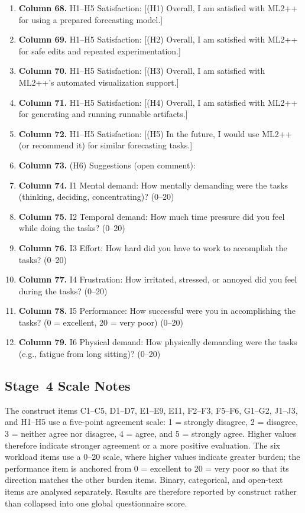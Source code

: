 \begin{enumerate}[leftmargin=*]
    \item \textbf{Column 68.} H1--H5 Satisfaction: [(H1) Overall, I am satisfied with ML2++ for using a prepared forecasting model.]
    \item \textbf{Column 69.} H1--H5 Satisfaction: [(H2) Overall, I am satisfied with ML2++ for safe edits and repeated experimentation.]
    \item \textbf{Column 70.} H1--H5 Satisfaction: [(H3) Overall, I am satisfied with ML2++'s automated visualization support.]
    \item \textbf{Column 71.} H1--H5 Satisfaction: [(H4) Overall, I am satisfied with ML2++ for generating and running runnable artifacts.]
    \item \textbf{Column 72.} H1--H5 Satisfaction: [(H5) In the future, I would use ML2++ (or recommend it) for similar forecasting tasks.]
    \item \textbf{Column 73.} (H6) Suggestions (open comment):
    \item \textbf{Column 74.} I1 Mental demand: How mentally demanding were the tasks (thinking, deciding, concentrating)? (0--20)
    \item \textbf{Column 75.} I2 Temporal demand: How much time pressure did you feel while doing the tasks? (0--20)
    \item \textbf{Column 76.} I3 Effort: How hard did you have to work to accomplish the tasks? (0--20)
    \item \textbf{Column 77.} I4 Frustration: How irritated, stressed, or annoyed did you feel during the tasks? (0--20)
    \item \textbf{Column 78.} I5 Performance: How successful were you in accomplishing the tasks? (0 = excellent, 20 = very poor) (0--20)
    \item \textbf{Column 79.} I6 Physical demand: How physically demanding were the tasks (e.g., fatigue from long sitting)? (0--20)
\end{enumerate}

\subsection{Stage~4 Scale Notes}
\label{app:stage4_scale_notes}

The construct items C1--C5, D1--D7, E1--E9, E11, F2--F3, F5--F6, G1--G2, J1--J3, and H1--H5 use a five-point agreement scale: 1 = strongly disagree, 2 = disagree, 3 = neither agree nor disagree, 4 = agree, and 5 = strongly agree. Higher values therefore indicate stronger agreement or a more positive evaluation. The six workload items use a 0--20 scale, where higher values indicate greater burden; the performance item is anchored from 0 = excellent to 20 = very poor so that its direction matches the other burden items. Binary, categorical, and open-text items are analysed separately. Results are therefore reported by construct rather than collapsed into one global questionnaire score.

